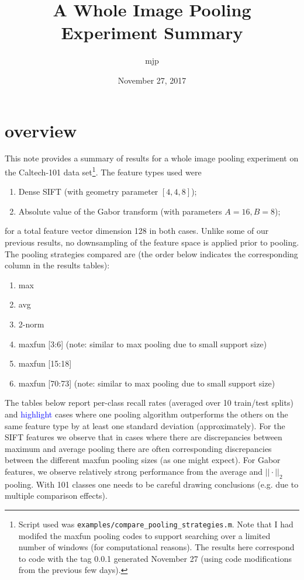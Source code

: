 \documentclass[10pt]{article}
\title{A Whole Image Pooling Experiment Summary}
\author{mjp}
\date{November 27, 2017}
\newcommand{\hl}[1]{\textcolor{blue}{#1}}
\begin{document}
\maketitle

\section*{overview}
This note provides a summary of results for a whole image pooling experiment on the Caltech-101 data set\footnote{
Script used was \texttt{examples/compare\_pooling\_strategies.m}.  Note that I had modifed the maxfun pooling codes to support searching over a limited number of windows (for computational reasons).  The results here correspond to code with the tag 0.0.1 generated November 27 (using code modifications from the previous few days).}.  The feature types used were
\begin{enumerate}
\item Dense SIFT (with geometry parameter $[4, 4, 8]$);
\item Absolute value of the Gabor transform (with parameters $A=16, B=8$);
\end{enumerate}
%
for a total feature vector dimension 128 in both cases.
Unlike some of our previous results, no downsampling of the feature space is applied prior to pooling.
The pooling strategies compared are (the order below indicates the corresponding column in the results tables):
%
\begin{enumerate}
\item max
\item avg
\item 2-norm
\item maxfun [3:6]       (note: similar to max pooling due to small support size)
\item maxfun [15:18]
\item maxfun [70:73]  (note: similar to max pooling due to small support size)
\end{enumerate}


The tables below report per-class recall rates (averaged over 10 train/test splits) and \hl{highlight} cases where one pooling algorithm outperforms the others on the same feature type by at least one standard deviation (approximately).
For the SIFT features we observe that in cases where there are discrepancies between maximum and average pooling there are often corresponding discrepancies between the different maxfun pooling sizes (as one might expect).
For Gabor features, we observe relatively strong performance from the average and $||\cdot||_2$ pooling.
With 101 classes one needs to be careful drawing conclusions (e.g. due to multiple comparison effects).
\end{document}
